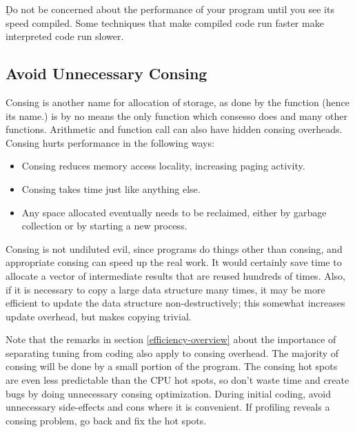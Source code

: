 \b{Do not} be concerned about the performance of your program until you
see its speed compiled.  Some techniques that make compiled code run
faster make interpreted code run slower.


\subsection{Avoid Unnecessary Consing}
\label{consing}


Consing is another name for allocation of storage, as done by the
 function (hence its name.)   is by no means the
only function which conses\dash{}so does  and many
other functions.  Arithmetic and function call can also have hidden
consing overheads.  Consing hurts performance in the following ways:
\begin{itemize}
  
\item Consing reduces memory access locality, increasing paging
  activity.
  
\item Consing takes time just like anything else.
  
\item Any space allocated eventually needs to be reclaimed, either by
  garbage collection or by starting a new  process.
\end{itemize}


Consing is not undiluted evil, since programs do things other than
consing, and appropriate consing can speed up the real work.  It would
certainly save time to allocate a vector of intermediate results that
are reused hundreds of times.  Also, if it is necessary to copy a
large data structure many times, it may be more efficient to update
the data structure non-destructively; this somewhat increases update
overhead, but makes copying trivial.

Note that the remarks in section \ref{efficiency-overview} about the
importance of separating tuning from coding also apply to consing
overhead.  The majority of consing will be done by a small portion of
the program.  The consing hot spots are even less predictable than the
CPU hot spots, so don't waste time and create bugs by doing
unnecessary consing optimization.  During initial coding, avoid
unnecessary side-effects and cons where it is convenient.  If
profiling reveals a consing problem,  go back and fix the
hot spots.

